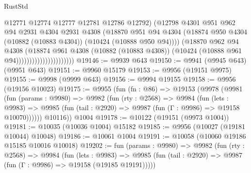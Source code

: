 \begin{lexlean}{RustStd}
\begin{coremodule}
                                        @12771
                                        @12774
                                        @12777
                                        @12781
                                        @12786
                                        @12792)
                                      (@12798
                                        @4301
                                        @951
                                        @962
                                        @94
                                        @2931
                                        @4304
                                        @2931
                                        @4308
                                        (@18870
                                          @951
                                          @94
                                          @4304
                                          (@18874
                                            @950
                                            @4304
                                            (@10882 (@10883 @4304))
                                            (@10424 (@10888 @950 @94))))
                                        (@18870
                                          @962
                                          @94
                                          @4308
                                          (@18874
                                            @961
                                            @4308
                                            (@10882 (@10883 @4308))
                                            (@10424 (@10888 @961 @94))))))))))))))))))))))
@19146 := @9939 @643
@19150 := @9941 (@9945 @643) (@9951 @643)
@19151 := @9960 @15179
@19153 := @9956 (@19151 @9975)
@19155 := @9998 (@9999 @643)
@19156 := @9994 @19155
@19158 := @9956 (@19156 @10023)
@19175 := @9955
    (fun (fn : @86) =>
    @19153
      (@9978
        (@9981
          (fun (params : @9980) =>
          @9982
            (fun (rty : @2568) =>
            @9984
              (fun (lets : @9983) =>
              @9985 (fun (tail : @2920) => @9987 (fun (Γ : @9986) => @19158 @10070))))))
        @10116))
    @1004
@19178 := @10122 (@19151 (@9973 @1004))
@19181 := @10035 (@10036 @1004) @15182
@19185 := @9956 (@10027 (@19181 @10044) @10048)
@19186 := @10061 @1004
@19191 := @10058 (@10060 @19186 @15185 @10016 @10018)
@19202 := fun (params : @9980) =>
  @9982
    (fun (rty : @2568) =>
    @9984
      (fun (lets : @9983) =>
      @9985 (fun (tail : @2920) => @9987 (fun (Γ : @9986) => @19158 (@19185 @19191)))))

\end{coremodule}
\end{lexlean}
